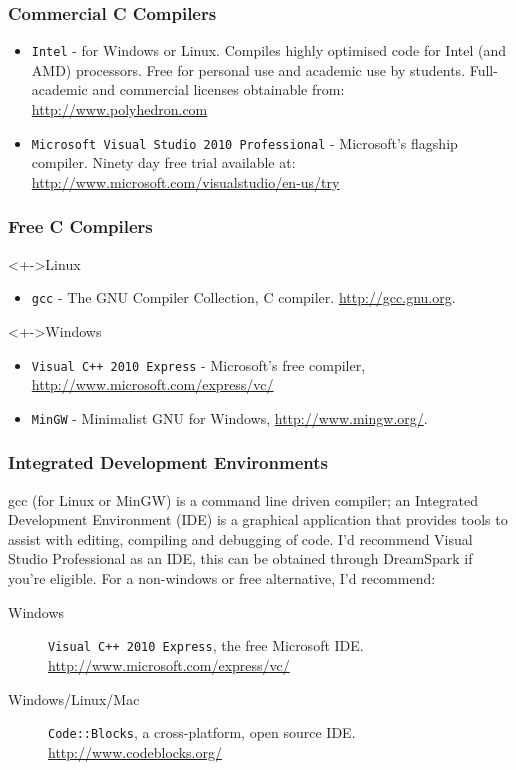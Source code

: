 \documentclass[smaller,handout,table]{beamer}
\begin{document}
\begin{frame}
\frametitle{Commercial C Compilers}
\begin{itemize}
\item {\tt Intel} - for Windows or Linux. Compiles highly optimised code for Intel (and AMD) processors. Free for personal use and academic use by students. Full-academic and commercial licenses obtainable from:
\url{http://www.polyhedron.com}
\item{\tt Microsoft Visual Studio 2010 Professional} - Microsoft's flagship compiler. Ninety day free trial available at:
\url{http://www.microsoft.com/visualstudio/en-us/try}
\end{itemize}
\end{frame}

\begin{frame}
\frametitle{Free C Compilers}
\begin{block}<+->{Linux}
\begin{itemize}
\item {\tt gcc} - The GNU Compiler Collection, C compiler.
\url{http://gcc.gnu.org}.
\end{itemize}
\begin{block}<+->{Windows}
\begin{itemize}
\item {\tt Visual C++ 2010 Express} - Microsoft's free compiler,
\url{http://www.microsoft.com/express/vc/}
\item {\tt MinGW} - Minimalist GNU for Windows,
\url{http://www.mingw.org/}.
\end{itemize}
\end{block}
\end{block}
\end{frame}

\begin{frame}
\frametitle{Integrated Development Environments}
gcc (for Linux or MinGW) is a command line driven compiler; an Integrated Development Environment (IDE) is a graphical application that provides tools to assist with editing, compiling and debugging of code. I'd recommend Visual Studio Professional as an IDE, this can be obtained through DreamSpark if you're eligible. For a non-windows or free alternative, I'd recommend:
\begin{block}{}
\begin{description}
\item[Windows] \texttt{Visual C++ 2010 Express}, the free Microsoft IDE. \url{http://www.microsoft.com/express/vc/}
\item[Windows/Linux/Mac] \texttt{Code::Blocks}, a cross-platform, open source IDE. \url{http://www.codeblocks.org/}
\end{description}
\end{block}
\end{frame}
\end{document}
